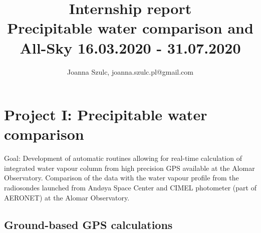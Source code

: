 \documentclass[]{book}
\title{%
	Internship report \\
	Precipitable water comparison
	and
	All-Sky
	\large 16.03.2020 - 31.07.2020}
\author{Joanna Szulc, joanna.szulc.pl@gmail.com}
\begin{document}
\maketitle
\tableofcontents

\chapter{Project I: Precipitable water comparison}

	Goal: Development of automatic routines allowing for real-time calculation of integrated water vapour column from high precision GPS available at the Alomar Observatory. Comparison of the data with the water vapour profile from the radiosondes launched from And\o{}ya Space Center and CIMEL photometer (part of AERONET) at the Alomar Observatory.
	
	\section{Ground-based GPS calculations}
	
\end{document}

